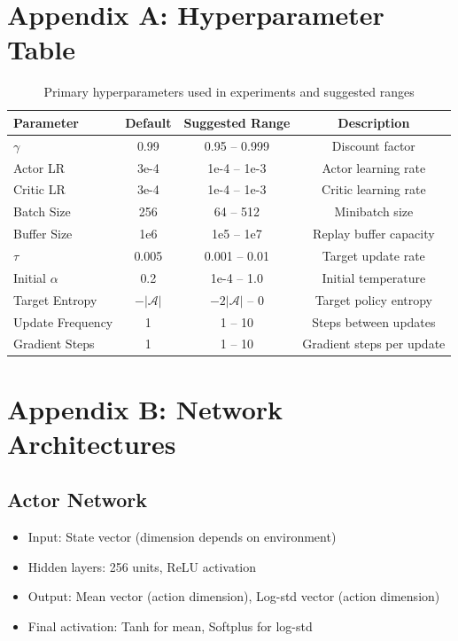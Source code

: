 \documentclass[conference]{IEEEtran}
\begin{document}
\section{Appendix A: Hyperparameter Table}
\begin{table}[H]
\centering
\caption{Primary hyperparameters used in experiments and suggested ranges}
\label{tab:hyperparams}
\begin{tabular}{lccc}
\toprule
Parameter & Default & Suggested Range & Description \\
\midrule
$\gamma$ & 0.99 & 0.95 -- 0.999 & Discount factor \\
Actor LR & 3e-4 & 1e-4 -- 1e-3 & Actor learning rate \\
Critic LR & 3e-4 & 1e-4 -- 1e-3 & Critic learning rate \\
Batch Size & 256 & 64 -- 512 & Minibatch size \\
Buffer Size & 1e6 & 1e5 -- 1e7 & Replay buffer capacity \\
$\tau$ & 0.005 & 0.001 -- 0.01 & Target update rate \\
Initial $\alpha$ & 0.2 & 1e-4 -- 1.0 & Initial temperature \\
Target Entropy & $-|\mathcal{A}|$ & $-2|\mathcal{A}|$ -- 0 & Target policy entropy \\
Update Frequency & 1 & 1 -- 10 & Steps between updates \\
Gradient Steps & 1 & 1 -- 10 & Gradient steps per update \\
\bottomrule
\end{tabular}
\end{table}

\section{Appendix B: Network Architectures}
\subsection{Actor Network}
\begin{itemize}
  \item Input: State vector (dimension depends on environment)
  \item Hidden layers: 256 units, ReLU activation
  \item Output: Mean vector (action dimension), Log-std vector (action dimension)
  \item Final activation: Tanh for mean, Softplus for log-std
\end{itemize}
\end{document}
